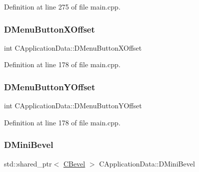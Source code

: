 Definition at line 275 of file main.\+cpp.

\hypertarget{classCApplicationData_a04283b17a8c04af8325de4304a848095}{}\label{classCApplicationData_a04283b17a8c04af8325de4304a848095} 
\subsubsection{\texorpdfstring{D\+Menu\+Button\+X\+Offset}{DMenuButtonXOffset}}
{\footnotesize\ttfamily int C\+Application\+Data\+::\+D\+Menu\+Button\+X\+Offset\hspace{0.3cm}{\ttfamily [protected]}}



Definition at line 178 of file main.\+cpp.

\hypertarget{classCApplicationData_a63012360d0a98eef89707a503f4379a8}{}\label{classCApplicationData_a63012360d0a98eef89707a503f4379a8} 
\subsubsection{\texorpdfstring{D\+Menu\+Button\+Y\+Offset}{DMenuButtonYOffset}}
{\footnotesize\ttfamily int C\+Application\+Data\+::\+D\+Menu\+Button\+Y\+Offset\hspace{0.3cm}{\ttfamily [protected]}}



Definition at line 178 of file main.\+cpp.

\hypertarget{classCApplicationData_ad6718b216878d9fe05b26cd24b89c6ee}{}\label{classCApplicationData_ad6718b216878d9fe05b26cd24b89c6ee} 
\subsubsection{\texorpdfstring{D\+Mini\+Bevel}{DMiniBevel}}
{\footnotesize\ttfamily std\+::shared\+\_\+ptr$<$ \hyperlink{classCBevel}{C\+Bevel} $>$ C\+Application\+Data\+::\+D\+Mini\+Bevel\hspace{0.3cm}{\ttfamily [protected]}}



